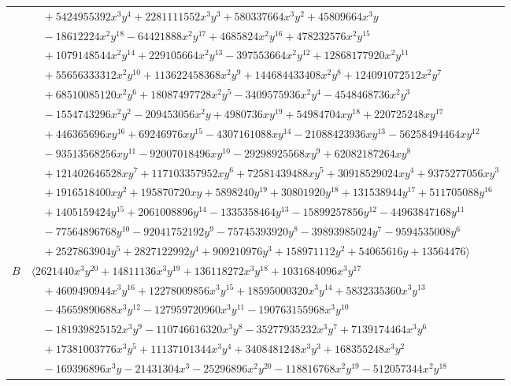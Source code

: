 \documentclass[11pt]{article}
\begin{document}
\begin{longtable}{@{}ll@{}}
 & $\quad +5424955392x^{3}y^{4}+2281111552x^{3}y^{3}+580337664x^{3}y^{2}+45809664x^{3}y$\\
 & $\quad -18612224x^{2}y^{18}-64421888x^{2}y^{17}+4685824x^{2}y^{16}+478232576x^{2}y^{15}$\\
 & $\quad +1079148544x^{2}y^{14}+229105664x^{2}y^{13}-397553664x^{2}y^{12}+12868177920x^{2}y^{11}$\\
 & $\quad +55656333312x^{2}y^{10}+113622458368x^{2}y^{9}+144684433408x^{2}y^{8}+124091072512x^{2}y^{7}$\\
 & $\quad +68510085120x^{2}y^{6}+18087497728x^{2}y^{5}-3409575936x^{2}y^{4}-4548468736x^{2}y^{3}$\\
 & $\quad -1554743296x^{2}y^{2}-209453056x^{2}y+4980736xy^{19}+54984704xy^{18}+220725248xy^{17}$\\
 & $\quad +446365696xy^{16}+69246976xy^{15}-4307161088xy^{14}-21088423936xy^{13}-56258494464xy^{12}$\\
 & $\quad -93513568256xy^{11}-92007018496xy^{10}-29298925568xy^{9}+62082187264xy^{8}$\\
 & $\quad +121402646528xy^{7}+117103357952xy^{6}+72581439488xy^{5}+30918529024xy^{4}+9375277056xy^{3}$\\
 & $\quad +1916518400xy^{2}+195870720xy+5898240y^{19}+30801920y^{18}+131538944y^{17}+511705088y^{16}$\\
 & $\quad +1405159424y^{15}+2061008896y^{14}-1335358464y^{13}-15899257856y^{12}-44963847168y^{11}$\\
 & $\quad -77564896768y^{10}-92041752192y^{9}-75745393920y^{8}-39893985024y^{7}-9594535008y^{6}$\\
 & $\quad +2527863904y^{5}+2827122992y^{4}+909210976y^{3}+158971112y^{2}+54065616y+13564476\rangle$\\
$B$ & $\langle 2621440x^{3}y^{20}+14811136x^{3}y^{19}+136118272x^{3}y^{18}+1031684096x^{3}y^{17}$\\
 & $\quad +4609490944x^{3}y^{16}+12278009856x^{3}y^{15}+18595000320x^{3}y^{14}+5832335360x^{3}y^{13}$\\
 & $\quad -45659890688x^{3}y^{12}-127959720960x^{3}y^{11}-190763155968x^{3}y^{10}$\\
 & $\quad -181939825152x^{3}y^{9}-110746616320x^{3}y^{8}-35277935232x^{3}y^{7}+7139174464x^{3}y^{6}$\\
 & $\quad +17381003776x^{3}y^{5}+11137101344x^{3}y^{4}+3408481248x^{3}y^{3}+168355248x^{3}y^{2}$\\
 & $\quad -169396896x^{3}y-21431304x^{3}-25296896x^{2}y^{20}-118816768x^{2}y^{19}-512057344x^{2}y^{18}$\\

\end{longtable}
\end{document}
